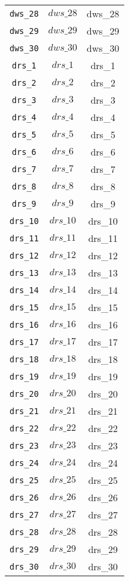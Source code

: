 \begin{center}
\begin{longtable}{ccc}
\texttt{dws\_28} & $dws\_28$ & dws\_28\\
\texttt{dws\_29} & $dws\_29$ & dws\_29\\
\texttt{dws\_30} & $dws\_30$ & dws\_30\\
\texttt{drs\_1} & $drs\_1$ & drs\_1\\
\texttt{drs\_2} & $drs\_2$ & drs\_2\\
\texttt{drs\_3} & $drs\_3$ & drs\_3\\
\texttt{drs\_4} & $drs\_4$ & drs\_4\\
\texttt{drs\_5} & $drs\_5$ & drs\_5\\
\texttt{drs\_6} & $drs\_6$ & drs\_6\\
\texttt{drs\_7} & $drs\_7$ & drs\_7\\
\texttt{drs\_8} & $drs\_8$ & drs\_8\\
\texttt{drs\_9} & $drs\_9$ & drs\_9\\
\texttt{drs\_10} & $drs\_10$ & drs\_10\\
\texttt{drs\_11} & $drs\_11$ & drs\_11\\
\texttt{drs\_12} & $drs\_12$ & drs\_12\\
\texttt{drs\_13} & $drs\_13$ & drs\_13\\
\texttt{drs\_14} & $drs\_14$ & drs\_14\\
\texttt{drs\_15} & $drs\_15$ & drs\_15\\
\texttt{drs\_16} & $drs\_16$ & drs\_16\\
\texttt{drs\_17} & $drs\_17$ & drs\_17\\
\texttt{drs\_18} & $drs\_18$ & drs\_18\\
\texttt{drs\_19} & $drs\_19$ & drs\_19\\
\texttt{drs\_20} & $drs\_20$ & drs\_20\\
\texttt{drs\_21} & $drs\_21$ & drs\_21\\
\texttt{drs\_22} & $drs\_22$ & drs\_22\\
\texttt{drs\_23} & $drs\_23$ & drs\_23\\
\texttt{drs\_24} & $drs\_24$ & drs\_24\\
\texttt{drs\_25} & $drs\_25$ & drs\_25\\
\texttt{drs\_26} & $drs\_26$ & drs\_26\\
\texttt{drs\_27} & $drs\_27$ & drs\_27\\
\texttt{drs\_28} & $drs\_28$ & drs\_28\\
\texttt{drs\_29} & $drs\_29$ & drs\_29\\
\texttt{drs\_30} & $drs\_30$ & drs\_30\\

\end{longtable}
\end{center}
